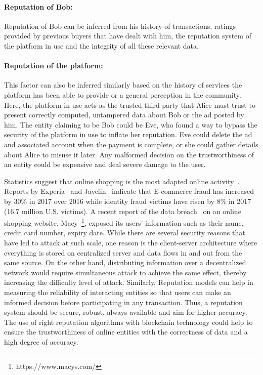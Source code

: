 \paragraph{Reputation of Bob:} Reputation of Bob can be inferred from his
history of transactions, ratings provided by previous buyers that have dealt
with him, the reputation system of the platform in use and the integrity of all
these relevant data.  
\paragraph{Reputation of the platform:} This factor can also be inferred
similarly based on the history of services the platform has been able to
provide or a general perception in the community. Here, the platform in use
acts as the trusted third party that Alice must trust to present correctly
computed, untampered data about Bob or the ad posted by him. The entity
claiming to be Bob could be Eve, who found a way to bypass the security of the
platform in use to inflate her reputation. Eve could delete the ad and
associated account when the payment is complete, or she could gather details
about Alice to misuse it later. Any malformed decision on the trustworthiness
of an entity could be expensive and deal severe damage to the user. \par
Statistics suggest that online shopping is the most adapted online
activity~\cite{experian}. Reports by Experia~\cite{experian} and
Javelin~\cite{javelin} indicate that E-commerce fraud has increased by 30\% in
2017 over 2016 while identity fraud victims have risen by 8\% in 2017 (16.7
million U.S. victims). A recent report of the data breach~\cite{macy} on an
online shopping website, Macy~\footnote{https://www.macys.com/}, exposed its
users' information such as their name, credit card number, expiry date. While
there are several security reasons that have led to attack at such scale, one
reason is the client-server architecture where everything is stored on
centralized server and data flows in and out from the same source. On the other
hand, distributing information over a decentralized network would require
simultaneous attack to achieve the same effect, thereby increasing the
difficulty level of attack. Similarly, Reputation models can help in measuring
the reliability of interacting entities so that users can make an informed
decision before participating in any transaction. Thus, a reputation system
should be secure, robust, always available and aim for higher accuracy. The use
of right reputation algorithms with blockchain technology could help to ensure
the trustworthiness of online entities with the correctness of data and a high
degree of accuracy.  
 
